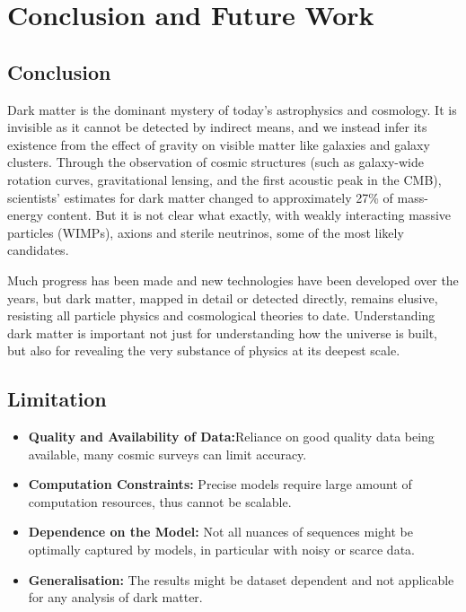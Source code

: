 \chapter{Conclusion and Future Work}

\section{Conclusion}
Dark matter is the dominant mystery of today’s astrophysics and cosmology. It is invisible as it cannot be detected by indirect means, and we instead infer its existence from the effect of gravity on visible matter like galaxies and galaxy clusters. Through the observation of cosmic structures (such as galaxy-wide rotation curves, gravitational lensing, and the first acoustic peak in the CMB), scientists' estimates for dark matter changed to approximately 27\% of mass-energy content. But it is not clear what exactly, with weakly interacting massive particles (WIMPs), axions and sterile neutrinos, some of the most likely candidates.

Much progress has been made and new technologies have been developed over the years, but dark matter, mapped in detail or detected directly, remains elusive, resisting all particle physics and cosmological theories to date. Understanding dark matter is important not just for understanding how the universe is built, but also for revealing the very substance of physics at its deepest scale.

\section{Limitation}

\begin{itemize}
    \item \textbf{Quality and Availability of Data:}Reliance on good quality data being available, many cosmic surveys can limit accuracy.

    \item \textbf{Computation Constraints:} Precise models require large amount of computation resources, thus cannot be scalable.

    \item \textbf{Dependence on the Model:} Not all nuances of sequences might be optimally captured by models, in particular with noisy or scarce data.

    \item \textbf{Generalisation: }The results might be dataset dependent and not applicable for any analysis of dark matter.
\end{itemize}


